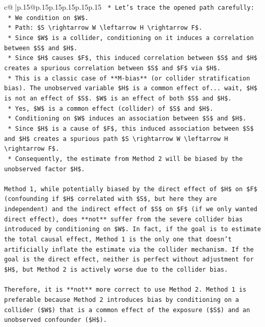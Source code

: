 \documentclass{article}
\begin{document}
{\begin{supertabular}{c@{$\;$}|p{.15\linewidth}@{}p{.15\linewidth}p{.15\linewidth}p{.15\linewidth}p{.15\linewidth}p{.15\linewidth}}
{{{\texttt{    *   Let's trace the opened path carefully:} \\
\texttt{    *   We condition on \$W\$.} \\
\texttt{    *   Path: \$S \textbackslash{}rightarrow W \textbackslash{}leftarrow H \textbackslash{}rightarrow F\$.} \\
\texttt{    *   Since \$W\$ is a collider, conditioning on it induces a correlation between \$S\$ and \$H\$.} \\
\texttt{    *   Since \$H\$ causes \$F\$, this induced correlation between \$S\$ and \$H\$ creates a spurious correlation between \$S\$ and \$F\$ via \$H\$.} \\
\texttt{    *   This is a classic case of **M{-}bias** (or collider stratification bias). The unobserved variable \$H\$ is a common effect of... wait, \$H\$ is not an effect of \$S\$. \$W\$ is an effect of both \$S\$ and \$H\$.} \\
\texttt{    *   Yes, \$W\$ is a common effect (collider) of \$S\$ and \$H\$.} \\
\texttt{    *   Conditioning on \$W\$ induces an association between \$S\$ and \$H\$.} \\
\texttt{    *   Since \$H\$ is a cause of \$F\$, this induced association between \$S\$ and \$H\$ creates a spurious path \$S \textbackslash{}rightarrow W \textbackslash{}leftarrow H \textbackslash{}rightarrow F\$.} \\
\texttt{    *   Consequently, the estimate from Method 2 will be biased by the unobserved factor \$H\$.} \\
\\ 
\texttt{Method 1, while potentially biased by the direct effect of \$H\$ on \$F\$ (confounding if \$H\$ correlated with \$S\$, but here they are independent) and the indirect effect of \$S\$ on \$F\$ (if we only wanted direct effect), does **not** suffer from the severe collider bias introduced by conditioning on \$W\$. In fact, if the goal is to estimate the total causal effect, Method 1 is the only one that doesn't artificially inflate the estimate via the collider mechanism. If the goal is the direct effect, neither is perfect without adjustment for \$H\$, but Method 2 is actively worse due to the collider bias.} \\
\\ 
\texttt{Therefore, it is **not** more correct to use Method 2. Method 1 is preferable because Method 2 introduces bias by conditioning on a collider (\$W\$) that is a common effect of the exposure (\$S\$) and an unobserved confounder (\$H\$).} \\
}}}
\end{supertabular}}
\end{document}
